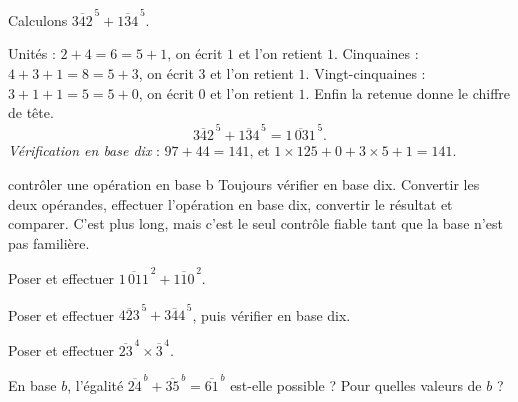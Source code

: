 \begin{exemple}
Calculons $\overline{342}^{\,5}+\overline{134}^{\,5}$.

Unités : $2+4 = 6 = 5+1$, on écrit $1$ et l'on retient $1$.
Cinquaines : $4+3+1 = 8 = 5+3$, on écrit $3$ et l'on retient $1$.
Vingt-cinquaines : $3+1+1 = 5 = 5+0$, on écrit $0$ et l'on retient $1$.
Enfin la retenue donne le chiffre de tête.
\[
  \overline{342}^{\,5}+\overline{134}^{\,5} = \overline{1\,031}^{\,5}.
\]
\emph{Vérification en base dix} : $97+44 = 141$, et
$1\times125+0+3\times5+1 = 141$.
\end{exemple}

\begin{methode}{contrôler une opération en base b}
Toujours vérifier en base dix. Convertir les deux opérandes, effectuer
l'opération en base dix, convertir le résultat et comparer. C'est plus long,
mais c'est le seul contrôle fiable tant que la base n'est pas familière.
\end{methode}

\begin{entrainement}[opérations]
\exo[\niveau{1}] Poser et effectuer
$\overline{1\,011}^{\,2}+\overline{110}^{\,2}$.

\exo[\niveau{2}] Poser et effectuer
$\overline{423}^{\,5}+\overline{344}^{\,5}$, puis vérifier en base dix.

\exo[\niveau{2}] Poser et effectuer $\overline{23}^{\,4}\times
\overline{3}^{\,4}$.

\exo[\niveau{3}] En base $b$, l'égalité $\overline{24}^{\,b}+\overline{35}^{\,b}
= \overline{61}^{\,b}$ est-elle possible ? Pour quelles valeurs de $b$ ?
\end{entrainement}

